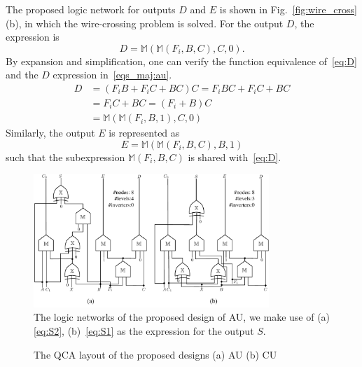 \documentclass[9pt,journal,compsoc]{IEEEtran}
\begin{document}
The proposed logic network for outputs $D$ and $E$ is shown in Fig.~\ref{fig:wire_cross}(b), in which the wire-crossing problem is solved.
For the output $D$, the expression is
\begin{equation}\label{eq:D}
D = \mathbb{M}(\mathbb{M}(F_{i}, B, C), C, 0).
\end{equation}
By expansion and simplification, one can verify the function equivalence of~\eqref{eq:D} and the $D$ expression in~\eqref{eqs_maj:au}.
\begin{equation}
\begin{split}
D &= (F_iB + F_iC + BC)C = F_iBC + F_iC + BC \\
  &= F_iC + BC = (F_i + B)C \\
  &= \mathbb{M}(\mathbb{M}(F_i, B, 1), C, 0 )
\end{split}
\end{equation}
Similarly, the output $E$ is represented as
\begin{equation}\label{eq:E}
E = \mathbb{M}(\mathbb{M}(F_{i}, B, C), B, 1)
\end{equation}
such that the subexpression $\mathbb{M}(F_{i}, B, C)$ is shared with~\eqref{eq:D}.

\begin{figure}[t]
\centering
\includegraphics[width=3.5in]{fig/au_netlist.pdf}
\caption{The logic networks of the proposed design of AU, we make use of (a) \eqref{eq:S2}, (b)~\eqref{eq:S1} as the expression for the output $S$.}
\label{fig:au_netlist}
\end{figure}

 \begin{figure}[b]
     \centering
     \caption{The QCA layout of the proposed designs (a) AU (b) CU}\label{fig:cu_au}
 \end{figure}
\end{document}
